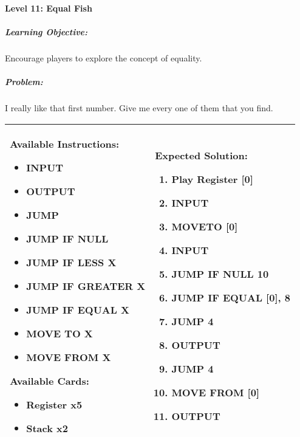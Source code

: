 \paragraph{Level 11: Equal Fish}
\subparagraph{Learning Objective:} Encourage players to explore the concept of equality.

\subparagraph{Problem:} I really like that first number. Give me every one of them that you find.

\begin{center}
    \begin{tabular}{ | m{6cm} | m{8cm} | } 
        \hline
            \textbf{Available Instructions:} 
            \begin{itemize}
                \setlength\itemsep{-.35em}
                \item INPUT
                \item OUTPUT
                \item JUMP
                \item JUMP IF NULL
                \item JUMP IF LESS X
                \item JUMP IF GREATER X
		\item JUMP IF EQUAL X
                \item MOVE TO X
                \item MOVE FROM X
            \end{itemize}
            \textbf{Available Cards:} 
            \begin{itemize}
                \setlength\itemsep{-.35em}
                \item Register x5
                \item Stack x2
            \end{itemize}& 
            \textbf{Expected Solution:} 
            \begin{enumerate}
                \setlength\itemsep{-.35em}
                \item Play Register [0]
                \item INPUT
                \item MOVETO [0]
                \item INPUT
                \item JUMP IF NULL 10
                \item JUMP IF EQUAL [0], 8
                \item JUMP 4
                \item OUTPUT
		\item JUMP 4
                \item MOVE FROM [0]
                \item OUTPUT
            \end{enumerate}
            \\
        \hline
    \end{tabular}
\end{center}


